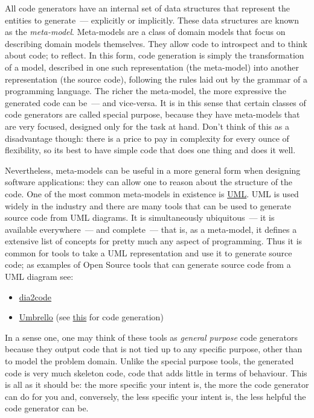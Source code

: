 \documentclass{book}
\begin{document}
All code generators have an internal set of data structures that
represent the entities to generate~--- explicitly or implicitly. These
data structures are known as the \emph{meta-model}. Meta-models are a
class of domain models that focus on describing domain models
themselves. They allow code to introspect and to think about code; to
reflect. In this form, code generation is simply the transformation of
a model, described in one such representation (the meta-model) into
another representation (the source code), following the rules laid out
by the grammar of a programming language. The richer the meta-model,
the more expressive the generated code can be~--- and vice-versa. It
is in this sense that certain classes of code generators are called
special purpose, because they have meta-models that are very focused,
designed only for the task at hand. Don't think of this as a
disadvantage though: there is a price to pay in complexity for every
ounce of flexibility, so its best to have simple code that does one
thing and does it well.

Nevertheless, meta-models can be useful in a more general form when
designing software applications: they can allow one to reason about
the structure of the code. One of the most common meta-models in
existence is
\href{http://en.wikipedia.org/wiki/Unified_Modeling_Language}{UML}. UML
is used widely in the industry and there are many tools that can be
used to generate source code from UML diagrams. It is simultaneously
ubiquitous~--- it is available everywhere~--- and complete~--- that
is, as a meta-model, it defines a extensive list of concepts for
pretty much any aspect of programming. Thus it is common for tools to
take a UML representation and use it to generate source code; as
examples of Open Source tools that can generate source code from a UML
diagram see:

\begin{itemize}
\item \href{http://dia2code.sourceforge.net/}{dia2code}
\item \href{http://umbrello.kde.org/}{Umbrello} (see \href{http://docs.kde.org/development/en/kdesdk/umbrello/code-import-generation.html}{this} for code generation)
\end{itemize}

In a sense one, one may think of these tools as \emph{general purpose}
code generators because they output code that is not tied up to any
specific purpose, other than to model the problem domain. Unlike the
special purpose tools, the generated code is very much skeleton code,
code that adds little in terms of behaviour. This is all as it should
be: the more specific your intent is, the more the code generator can
do for you and, conversely, the less specific your intent is, the less
helpful the code generator can be.
\end{document}
